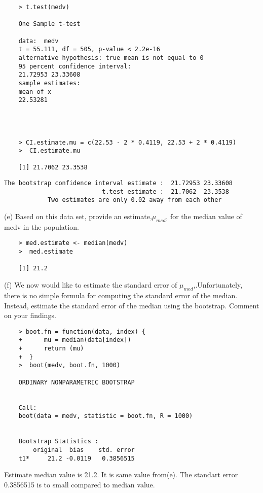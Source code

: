 \documentclass{article}
\begin{document}
\begin{program}
	\begin{verbatim}
	> t.test(medv)
	
	One Sample t-test
	
	data:  medv
	t = 55.111, df = 505, p-value < 2.2e-16
	alternative hypothesis: true mean is not equal to 0
	95 percent confidence interval:
	21.72953 23.33608
	sample estimates:
	mean of x 
	22.53281 
	
	
	
	
	> CI.estimate.mu = c(22.53 - 2 * 0.4119, 22.53 + 2 * 0.4119)
	>  CI.estimate.mu
	
	[1] 21.7062 23.3538
	 \end{verbatim}
\end{program}

\begin{verbatim}
The bootstrap confidence interval estimate :  21.72953 23.33608 
                           t.test estimate :  21.7062  23.3538
            Two estimates are only 0.02 away from each other

\end{verbatim}

(e) Based on this data set, provide an estimate,$\mu_{med}$, for the median value of medv in the population.

\begin{program}
	\begin{verbatim}
	> med.estimate <- median(medv)
	>  med.estimate
	
	[1] 21.2
	\end{verbatim}
\end{program}


\newpage
(f) We now would like to estimate the standard error of $\mu_{med}$,.Unfortunately, there is no simple formula for computing the standard error of the median. Instead, estimate the standard error of the median using the bootstrap. Comment on your findings.

\begin{program}
	\begin{verbatim}
	> boot.fn = function(data, index) { 
	+      mu = median(data[index]) 
	+      return (mu)
	+  }
	>  boot(medv, boot.fn, 1000)
	
	ORDINARY NONPARAMETRIC BOOTSTRAP
	
	
	Call:
	boot(data = medv, statistic = boot.fn, R = 1000)
	
	
	Bootstrap Statistics :
	    original  bias    std. error
	t1*     21.2 -0.0119   0.3856515
	\end{verbatim}
\end{program}
Estimate median value is 21.2. It is same value from(e). The standart error 0.3856515 is to small compared to median value.\\
\end{document}
